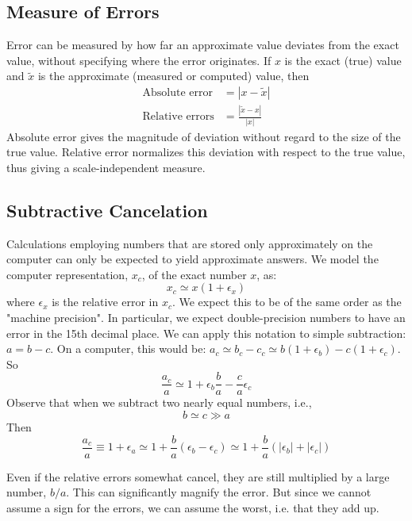 \documentclass[../../../main.tex]{subfiles}
\begin{document}
\subsection{Measure of Errors}
Error can be measured by how far an approximate value deviates from the exact value, without specifying where the error originates.
If $x$ is the exact (true) value and $\tilde{x}$ is the approximate (measured or computed) value, then
\begin{align*}
    \text{Absolute error}  & = |x-\tilde{x}|              \\
    \text{Relative errors} & =  \frac{|\tilde{x}-x|}{|x|}
\end{align*}
Absolute error gives the magnitude of deviation without regard to the size of the true value. Relative error normalizes this deviation with respect to the true value, thus giving a scale-independent measure.

\subsection{Subtractive Cancelation}
Calculations employing numbers that are stored only approximately on the computer can only be expected to yield approximate answers.
We model the computer representation, $x_c$, of the exact number $x$, as:
\begin{equation*}
    x_c \simeq x ( 1 + \epsilon_x )
\end{equation*}
where $\epsilon_x$ is the relative error in $x_c$.
We expect this to be of the same order as the "machine precision". In particular, we expect double-precision numbers to have an error in the 15th decimal place.
We can apply this notation to simple subtraction: $a = b - c$.
On a computer, this would be: $a_c \simeq b_c - c_c \simeq b(1+\epsilon_b) - c( 1 + \epsilon_c)$.
So
\begin{equation*}
    \frac{a_c}{a} \simeq 1 + \epsilon_b \frac{b}{a} - \frac{c}{a} \epsilon_c
\end{equation*}
Observe that when we subtract two nearly equal numbers, i.e.,
\begin{equation*}
    b \simeq c \gg a
\end{equation*}
Then
\begin{equation*}
    \frac{a_c}{a} \equiv 1 + \epsilon_a \simeq 1 + \frac{b}{a} (\epsilon_b - \epsilon_c) \simeq 1 + \frac{b}{a}(|\epsilon_b|+|\epsilon_c|)
\end{equation*}

Even if the relative errors somewhat cancel, they are still multiplied by a large number, $b/a$.
This can significantly magnify the error. But since we cannot assume a sign for the errors, we can assume the worst, i.e. that they add up.
\end{document}
